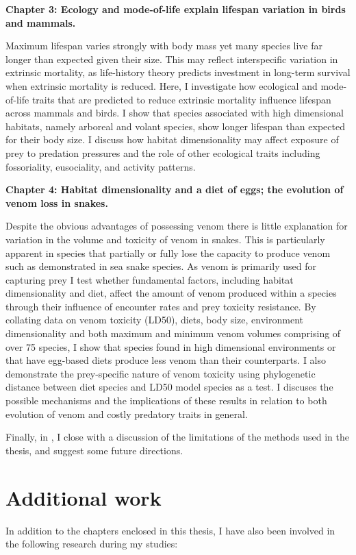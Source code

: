 \textbf{Chapter 3: Ecology and mode-of-life explain lifespan variation in birds and mammals.}

Maximum lifespan varies strongly with body mass yet many species live far longer than expected given their size. This may reflect interspecific variation in extrinsic mortality, as life-history theory predicts investment in long-term survival when extrinsic mortality is reduced. Here, I investigate how ecological and mode-of-life traits that are predicted to reduce extrinsic mortality influence lifespan across mammals and birds. I show that species associated with high dimensional habitats, namely arboreal and volant species, show longer lifespan than expected for their body size. I discuss how habitat dimensionality may affect exposure of prey to predation pressures and the role of other ecological traits including fossoriality, eusociality, and activity patterns.


\textbf{Chapter 4: Habitat dimensionality and a diet of eggs; the evolution of venom loss in snakes.}

Despite the obvious advantages of possessing venom there is little explanation for variation in the volume and toxicity of venom in snakes. This is particularly apparent in species that partially or fully lose the capacity to produce venom such as demonstrated in sea snake species. As venom is primarily used for capturing prey I test whether fundamental factors, including habitat dimensionality and diet, affect the amount of venom produced within a species through their influence of encounter rates and prey toxicity resistance. By collating data on venom toxicity (LD50), diets, body size, environment dimensionality and both maximum and minimum venom volumes comprising of over 75 species, I show that species found in high dimensional environments or that have egg-based diets produce less venom than their counterparts. I also demonstrate the prey-specific nature of venom toxicity using phylogenetic distance between diet species and LD50 model species as a test. I discuses the possible mechanisms and the implications of these results in relation to both evolution of venom and costly predatory traits in general.

%
%
Finally, in , I close with a discussion of the
limitations of the methods used in the thesis, and suggest some future
directions.

\section{\uppercase{A}dditional work}
In addition to the chapters enclosed in this thesis, I have also been involved in the following research during my studies:\\